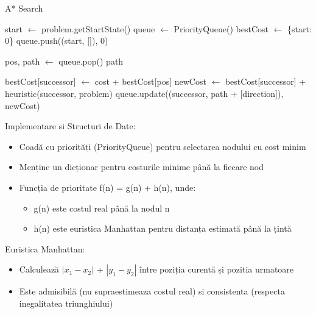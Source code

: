 \begin{algorithm}
\caption{A* Search}
\begin{algorithmic}[1]
    \State start $\gets$ problem.getStartState()
    \State queue $\gets$ PriorityQueue()
    \State bestCost $\gets$ \{start: 0\}
    \State queue.push((start, []), 0)
    
        \State pos, path $\gets$ queue.pop()
            \Return path
        \EndIf
        
                \State bestCost[successor] $\gets$ cost + bestCost[pos]
                \State newCost $\gets$ bestCost[successor] + heuristic(successor, problem)
                \State queue.update((successor, path + [direction]), newCost)
            \EndIf
        \EndFor
    \EndWhile \\
	\Return [ ]
\EndFunction
\end{algorithmic}
\end{algorithm}

\par Implementare si Structuri de Date:
\begin {itemize}
	\item Coadă cu priorități (PriorityQueue) pentru selectarea nodului cu cost minim
	\item Menține un dicționar pentru costurile minime până la fiecare nod
	\item Funcția de prioritate f(n) = g(n) + h(n), unde:
	\begin {itemize}
		\item g(n) este costul real până la nodul n
		\item h(n) este euristica Manhattan pentru distanța estimată până la țintă
	\end {itemize}
\end {itemize} 

\par Euristica Manhattan:

\begin {itemize}
	\item Calculează $|x_1-x_2|$ + $|y_1-y_2|$ între poziția curentă și pozitia urmatoare
	\item Este admisibilă (nu supraestimeaza costul real) si consistenta (respecta inegalitatea triunghiului)
\end {itemize}

